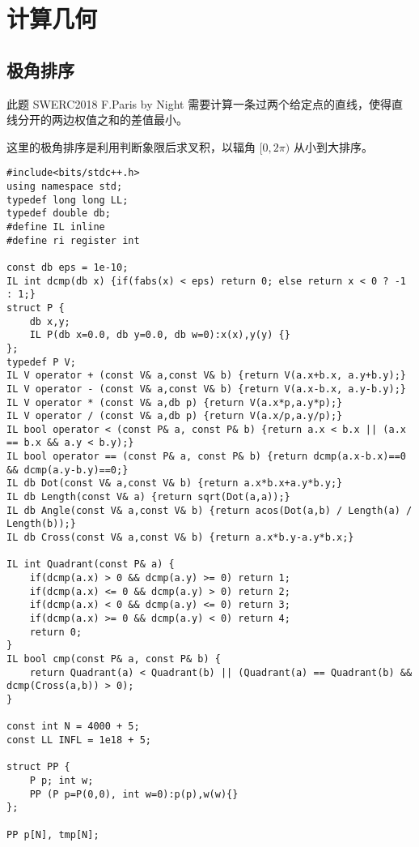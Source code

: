 \documentclass[UTF8]{ctexart}
\begin{document}
\newpage
\section{计算几何}

\subsection{极角排序}

此题 SWERC2018 F.Paris by Night 需要计算一条过两个给定点的直线，使得直线分开的两边权值之和的差值最小。

这里的极角排序是利用判断象限后求叉积，以辐角 $[0,2 \pi )$ 从小到大排序。

\begin{framed}
\begin{lstlisting}
#include<bits/stdc++.h>
using namespace std;
typedef long long LL;
typedef double db;
#define IL inline
#define ri register int

const db eps = 1e-10;
IL int dcmp(db x) {if(fabs(x) < eps) return 0; else return x < 0 ? -1 : 1;}
struct P {
    db x,y;
    IL P(db x=0.0, db y=0.0, db w=0):x(x),y(y) {}
};
typedef P V;
IL V operator + (const V& a,const V& b) {return V(a.x+b.x, a.y+b.y);}
IL V operator - (const V& a,const V& b) {return V(a.x-b.x, a.y-b.y);}
IL V operator * (const V& a,db p) {return V(a.x*p,a.y*p);}
IL V operator / (const V& a,db p) {return V(a.x/p,a.y/p);}
IL bool operator < (const P& a, const P& b) {return a.x < b.x || (a.x == b.x && a.y < b.y);}
IL bool operator == (const P& a, const P& b) {return dcmp(a.x-b.x)==0 && dcmp(a.y-b.y)==0;}
IL db Dot(const V& a,const V& b) {return a.x*b.x+a.y*b.y;}
IL db Length(const V& a) {return sqrt(Dot(a,a));}
IL db Angle(const V& a,const V& b) {return acos(Dot(a,b) / Length(a) / Length(b));}
IL db Cross(const V& a,const V& b) {return a.x*b.y-a.y*b.x;}

IL int Quadrant(const P& a) {
    if(dcmp(a.x) > 0 && dcmp(a.y) >= 0) return 1;
    if(dcmp(a.x) <= 0 && dcmp(a.y) > 0) return 2;
    if(dcmp(a.x) < 0 && dcmp(a.y) <= 0) return 3;
    if(dcmp(a.x) >= 0 && dcmp(a.y) < 0) return 4;
    return 0;
}
IL bool cmp(const P& a, const P& b) {
    return Quadrant(a) < Quadrant(b) || (Quadrant(a) == Quadrant(b) && dcmp(Cross(a,b)) > 0);
}

const int N = 4000 + 5;
const LL INFL = 1e18 + 5;

struct PP {
    P p; int w;
    PP (P p=P(0,0), int w=0):p(p),w(w){}
};

PP p[N], tmp[N];


\end{lstlisting}
\end{framed}
\end{document}
